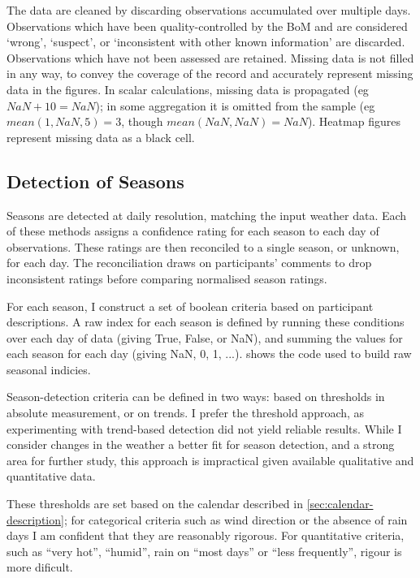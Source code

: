 The data are cleaned by discarding observations accumulated over multiple days.
Observations which have been quality-controlled by the BoM and are considered
`wrong', `suspect', or `inconsistent with other known information' are discarded.
Observations which have not been assessed are retained.
%
Missing data is not filled in any way, to convey the coverage of the record
and accurately represent missing data in the figures.  In scalar calculations,
missing data is propagated (eg ${NaN+10=NaN}$); in some aggregation
it is omitted from the sample (eg ${mean(1,NaN,5)=3}$, though
${mean(NaN,NaN)=NaN}$). Heatmap figures represent missing data as a black cell.


\subsection{Detection of Seasons}

Seasons are detected at daily resolution, matching the input weather data.
Each of these methods assigns a confidence rating for each season to each day of
observations.  These ratings are then reconciled to a single season, or unknown,
for each day.  The reconciliation draws on participants' comments to drop inconsistent
ratings before comparing normalised season ratings.

For each season, I construct a set of boolean criteria based on participant
descriptions.  A raw index for each season is defined by
running these conditions over each day of data (giving True, False, or NaN),
and summing the values for each season for each day (giving NaN, 0, 1, ...).
 shows the code used to build raw
seasonal indicies.

Season-detection criteria can be defined in two ways: based on thresholds
in absolute measurement, or on trends.  I prefer the threshold approach,
as experimenting with trend-based detection did not yield reliable results.
While I consider changes in the weather a better fit for season detection,
and a strong area for further study, this approach is impractical given available
qualitative and quantitative data.

These thresholds are set based on the calendar described in \cref{sec:calendar-description};
for categorical criteria such as wind direction or the absence of rain days
I am confident that they are reasonably rigorous.  For quantitative criteria,
such as ``very hot'', ``humid'', rain on ``most days'' or ``less frequently'',
rigour is more dificult.


